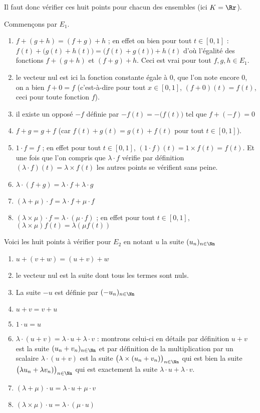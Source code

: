{{Il faut donc vérifier ces huit points pour chacun des ensembles (ici $K=\Rr$).

Commençons par $E_1$.
\begin{enumerate}
  \item $f+(g+h)=(f+g)+h$ ; en effet on bien pour tout $t\in[0,1]$ : $f(t)+\big(g(t)+h(t)\big)=\big(f(t)+g(t)\big)+h(t)$
d'où l'égalité des fonctions $f+(g+h)$ et $(f+g)+h$. Ceci est vrai pour tout $f,g,h \in E_1$.
  \item le vecteur nul est ici la fonction constante égale à $0$, que l'on note encore $0$, on a bien $f+0=f$ 
(c'est-à-dire pour tout $x\in[0,1]$, $(f+0)(t)=f(t)$, ceci pour toute fonction $f$).
  \item il existe un opposé $-f$ définie par $-f(t) = - \big(f(t)\big)$ tel que $f+(-f)=0$ 
  \item $f+g=g+f$ (car $f(t)+g(t)=g(t)+f(t)$ pour tout $t\in[0,1]$).
  \item $1\cdot f = f$ ; en effet pour tout $t\in[0,1]$, $(1\cdot f)(t) = 1\times f(t) = f(t)$.
Et une fois que l'on compris que $\lambda\cdot f$ vérifie par définition 
$(\lambda\cdot f)(t) = \lambda\times f(t)$ les autres points se vérifient sans peine.
  \item $\lambda \cdot (f+g) = \lambda\cdot f + \lambda \cdot g$
  \item $(\lambda+\mu) \cdot f = \lambda\cdot f+ \mu \cdot f$
  \item $(\lambda\times\mu) \cdot f = \lambda\cdot (\mu\cdot f)$ ; en effet pour tout $t\in [0,1]$,
 $(\lambda\times\mu)  f (t) = \lambda (\mu f(t))$
\end{enumerate}

\bigskip

Voici les huit points à vérifier pour $E_2$ en notant $u$ la suite $(u_n)_{n\in\Nn}$

\begin{enumerate}
  \item $u+(v+w)=(u+v)+w$ 
  \item le vecteur nul est la suite dont tous les termes sont nuls.
  \item La suite $-u$ est définie par $(-u_n)_{n\in\Nn}$
  \item $u+v=v+u$

  \item $1\cdot u = u$
  \item $\lambda \cdot (u+v) = \lambda\cdot u + \lambda \cdot v$ : montrons celui-ci en détails
par définition $u+v$ est la suite $(u_n+v_n)_{n\in\Nn}$ et par définition de la multiplication par un scalaire
$\lambda \cdot (u+v)$ est la suite $\big(\lambda\times (u_n+v_n)\big)_{n\in\Nn}$ qui est bien la suite
$\big(\lambda u_n+ \lambda v_n)\big)_{n\in\Nn}$ qui est exactement la suite $\lambda\cdot u + \lambda\cdot v$.
  \item $(\lambda+\mu) \cdot u = \lambda\cdot u+ \mu \cdot v$ 
  \item $(\lambda\times\mu) \cdot u = \lambda\cdot (\mu\cdot u)$ 
\end{enumerate}

}}
